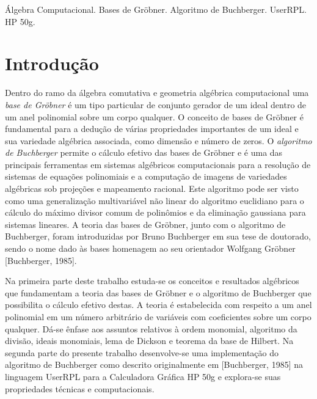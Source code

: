 \documentclass[12pt,a4paper]{report}
\numberwithin{theorem}{chapter}
\begin{document}
\vspace{1cm}

 Álgebra Computacional. Bases de
Gröbner. Algoritmo de Buchberger. UserRPL. HP 50g.

\thispagestyle{empty}



\newpage

\tableofcontents

\thispagestyle{empty}



\chapter*{Introdução}
\noindent

Dentro do ramo da álgebra comutativa e geometria algébrica
computacional uma \textit{base de Gröbner} é um tipo particular de
conjunto gerador de um ideal dentro de um anel polinomial sobre um
corpo qualquer.  O conceito de bases de Gröbner é fundamental para a
dedução de várias propriedades importantes de um ideal e sua variedade
algébrica associada, como dimensão e número de zeros.  O
\textit{algoritmo de Buchberger} permite o cálculo efetivo das bases
de Gröbner e é uma das principais ferramentas em sistemas algébricos
computacionais para a resolução de sistemas de equações polinomiais e
a computação de imagens de variedades algébricas sob projeções e
mapeamento racional.  Este algoritmo pode ser visto como uma
generalização multivariável não linear do algoritmo euclidiano para o
cálculo do máximo divisor comum de polinômios e da eliminação
gaussiana para sistemas lineares.  A teoria das bases de Gröbner,
junto com o algoritmo de Buchberger, foram introduzidas por Bruno
Buchberger em sua tese de doutorado, sendo o nome dado às bases
homenagem ao seu orientador Wolfgang Gröbner [Buchberger, 1985].

Na primeira parte deste trabalho estuda-se os conceitos e resultados
algébricos que fundamentam a teoria das bases de Gröbner e o algoritmo
de Buchberger que possibilita o cálculo efetivo destas.  A teoria é
estabelecida com respeito a um anel polinomial em um número arbitrário
de variáveis com coeficientes sobre um corpo qualquer.  Dá-se ênfase
aos assuntos relativos à ordem monomial, algoritmo da divisão, ideais
monomiais, lema de Dickson e teorema da base de Hilbert.  Na segunda
parte do presente trabalho desenvolve-se uma implementação do
algoritmo de Buchberger como descrito originalmente em [Buchberger,
1985] na linguagem UserRPL para a Calculadora Gráfica HP 50g e
explora-se suas propriedades técnicas e computacionais.
\end{document}
